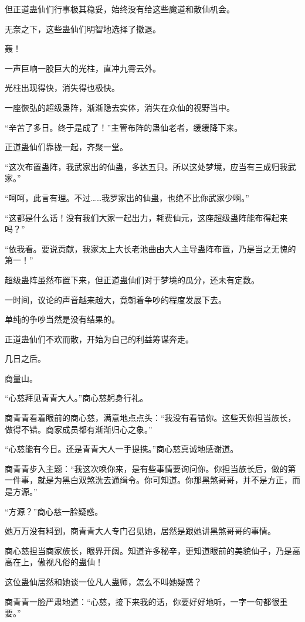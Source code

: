 \begin{this_body}
但正道蛊仙们行事极其稳妥，始终没有给这些魔道和散仙机会。

无奈之下，这些蛊仙们明智地选择了撤退。

轰！

一声巨响一股巨大的光柱，直冲九霄云外。

光柱出现得快，消失得也极快。

一座恢弘的超级蛊阵，渐渐隐去实体，消失在众仙的视野当中。

“辛苦了多日。终于是成了！”主管布阵的蛊仙老者，缓缓降下来。

正道蛊仙们靠拢一起，齐聚一堂。

“这次布置蛊阵，我武家出的仙蛊，多达五只。所以这处梦境，应当有三成归我武家。”

“呵呵，此言有理。不过……我罗家出的仙蛊，也绝不比你武家少啊。”

“这都是什么话！没有我们大家一起出力，耗费仙元，这座超级蛊阵能布得起来吗？”

“依我看。要说贡献，我家太上大长老池曲由大人主导蛊阵布置，乃是当之无愧的第一！”

超级蛊阵虽然布置下来，但正道蛊仙们对于梦境的瓜分，还未有定数。

一时间，议论的声音越来越大，竟朝着争吵的程度发展下去。

单纯的争吵当然是没有结果的。

正道蛊仙们不欢而散，开始为自己的利益筹谋奔走。

几日之后。

商量山。

“心慈拜见青青大人。”商心慈躬身行礼。

商青青看着眼前的商心慈，满意地点点头：“我没有看错你。这些天你担当族长，做得不错。商家成员都有渐渐归心之象。”

“心慈能有今日。还是青青大人一手提携。”商心慈真诚地感谢道。

商青青步入主题：“我这次唤你来，是有些事情要询问你。你担当族长后，做的第一件事，就是为黑白双煞洗去通缉令。你可知道。你那黑煞哥哥，并不是方正，而是方源。”

“方源？”商心慈一脸疑惑。

她万万没有料到，商青青大人专门召见她，居然是跟她讲黑煞哥哥的事情。

商心慈担当商家族长，眼界开阔。知道许多秘辛，更知道眼前的美貌仙子，乃是高高在上，傲视凡俗的蛊仙！

这位蛊仙居然和她谈一位凡人蛊师，怎么不叫她疑惑？

商青青一脸严肃地道：“心慈，接下来我的话，你要好好地听，一字一句都很重要。”


\end{this_body}
